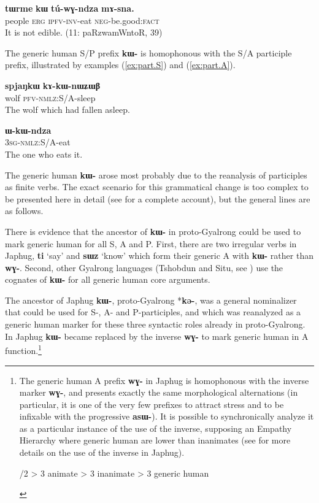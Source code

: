 \documentclass[oldfontcommands,oneside,a4paper,11pt]{article}
\newcommand{\ipa}[1]{\mbox{\phon\textbf{#1}}} %
\begin{document}
\begin{exe}
\ex  \label{ex:genr.tWrme}
\gll
\ipa{tɯrme} 	\ipa{kɯ} 	\ipa{tú-wɣ-ndza} 	\ipa{mɤ-sna.} \\
people \textsc{erg} \textsc{ipfv-inv}-eat \textsc{neg}-be.good:\textsc{fact} \\
\glt It is not edible. (11: paRzwamWntoR, 39)
\end{exe}

The generic human S/P prefix \ipa{kɯ-} is homophonous with the S/A participle prefix, illustrated by examples (\ref{ex:part.S}) and (\ref{ex:part.A}).

\begin{exe}
\ex \label{ex:part.S}
\gll \ipa{spjaŋkɯ}	\ipa{kɤ-kɯ-nɯʑɯβ}	\\
wolf \textsc{pfv-nmlz}:S/A-sleep \\
\glt The wolf which had fallen asleep.
\end{exe}

\begin{exe}
\ex \label{ex:part.A}
\gll \ipa{ɯ-kɯ-ndza} \\
\textsc{3sg-nmlz}:S/A-eat \\
\glt The one who eats it.
\end{exe}

The generic human \ipa{kɯ-} arose most probably due to the reanalysis of participles as finite verbs. The exact scenario for this grammatical change is too complex to be presented here in detail (see \citealt{jacques15generic} for a complete account), but the general lines are as follows.

There is evidence that the ancestor of \ipa{kɯ-} in proto-Gyalrong could be used to mark generic human for all S, A and P. First, there are two irregular verbs in Japhug, \ipa{ti} `say' and \ipa{sɯz} `know' which form their generic A with \ipa{kɯ-} rather than \ipa{wɣ-}. Second, other Gyalrong  languages (Tshobdun and Situ, see \citealt{sun14generic}) use the cognates of \ipa{kɯ-} for all generic human core arguments.
 
The ancestor of Japhug \ipa{kɯ-}, proto-Gyalrong *\ipa{kə-}, was a general nominalizer that could be used for S-, A- and P-participles, and which was reanalyzed as a generic human marker for these three syntactic roles already in proto-Gyalrong. In Japhug \ipa{kɯ-} became replaced by the inverse \ipa{wɣ-} to mark generic human in A function.\footnote{The generic human A prefix  \ipa{wɣ-} in Japhug is homophonous with the inverse marker \ipa{wɣ-}, and presents exactly the same morphological alternations (in particular, it is one of the very few prefixes to attract stress and to be infixable with the progressive \ipa{asɯ-}). It is possible to synchronically analyze it  as a particular instance of the use of the inverse, supposing an Empathy Hierarchy where generic human are lower than inanimates (see \citealt{jacques10inverse, jacques12demotion} for more details on the use of the inverse in Japhug). 

\begin{exe}
\ex 
{}/2 > 3 animate > 3 inanimate > 3 generic human
\end{exe}
}
\end{document}
